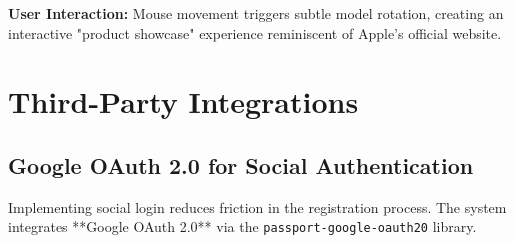 \textbf{User Interaction:} Mouse movement triggers subtle model rotation, creating an interactive "product showcase" experience reminiscent of Apple's official website.

\section{Third-Party Integrations}

\subsection{Google OAuth 2.0 for Social Authentication}

Implementing social login reduces friction in the registration process. The system integrates **Google OAuth 2.0** via the \texttt{passport-google-oauth20} library.

